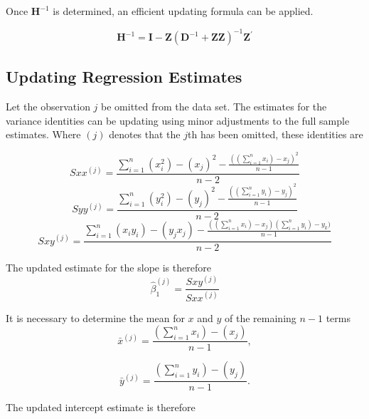 \documentclass[12pt, a4paper]{report}
\theoremstyle{plain}
\theoremstyle{definition}
\theoremstyle{remark}
\begin{document}
	Once $\boldsymbol{H}^{-1}$ is determined, an efficient updating formula can be applied.
	
	
	
	\begin{equation}
	\boldsymbol{H}^{-1} = \boldsymbol{I} - \boldsymbol{Z}(\boldsymbol{D}^{-1} + \boldsymbol{ZZ})^{-1}\boldsymbol{Z^{\prime}}
	\end{equation}
	
	
	
	
	
	\subsection{Updating Regression Estimates}
	Let the observation $j$ be omitted from the data set. The estimates for the variance identities can be updating using minor adjustments to the full sample estimates. Where $(j)$ denotes that the $j$th has been omitted, these identities are
	
	\begin{equation}
	Sxx^{(j)}=\frac{\sum_{i=1}^{n}(x_{i}^{2})-(x_{j})^{2}-\frac{((\sum_{i=1}^{n}x_{i})-x_{j})^{2}}{n-1}}{n-2}
	\end{equation}
	\begin{equation}
	Syy^{(j)}=\frac{\sum_{i=1}^{n}(y_{i}^{2})-(y_{j})^{2}-\frac{((\sum_{i=1}^{n}y_{i})-y_{j})^{2}}{n-1}}{n-2}
	\end{equation}
	\begin{equation}
	Sxy^{(j)}=\frac{\sum_{i=1}^{n}(x_{i}y_{i})-(y_{j}x_{j})-\frac{((\sum_{i=1}^{n}x_{i})-x_{j})(\sum_{i=1}^{n}y_{i})-y_{k})}{n-1}}{n-2}
	\end{equation}
	
	The updated estimate for the slope is therefore
	\begin{equation}
	\hat{\beta}_{1}^{(j)}=\frac{Sxy^{(j)}}{Sxx^{(j)}}
	\end{equation}
	
	It is necessary to determine the mean for $x$ and $y$ of the remaining $n-1$ terms
	\begin{equation}
	\bar{x}^{(j)}=\frac{(\sum_{i=1}^{n}x_{i})-(x_{j})}{n-1},
	\end{equation}
	
	\begin{equation}
	\bar{y}^{(j)}=\frac{(\sum_{i=1}^{n}y_{i})-(y_{j})}{n-1}.
	\end{equation}
	
	The updated intercept estimate is therefore
	
\end{document}
